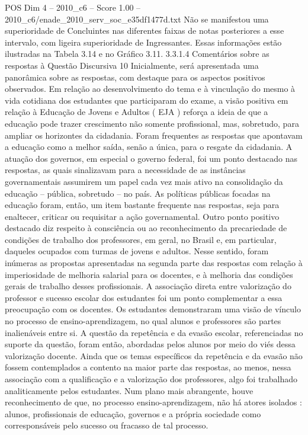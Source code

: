 \begin{textsample}{POS Dim 4 – 2010\_c6 – Score 1.00 – 2010\_c6/enade\_2010\_serv\_soc\_e35df1477d.txt}
Não se manifestou uma superioridade de Concluintes nas diferentes faixas de notas posteriores a esse intervalo, com ligeira superioridade de Ingressantes.
Essas informações estão ilustradas na Tabela 3.14 e no Gráfico 3.11. 3.3.1.4 Comentários sobre as respostas à Questão Discursiva 10 Inicialmente, será apresentada uma panorâmica sobre as respostas, com destaque para os aspectos positivos observados.
Em relação ao desenvolvimento do tema e à vinculação do mesmo à vida cotidiana dos estudantes que participaram do exame, a visão positiva em relação à Educação de Jovens e Adultos ( EJA ) reforça a ideia de que a educação pode trazer crescimento não somente profissional, mas, sobretudo, para ampliar os horizontes da cidadania.
Foram frequentes as respostas que apontavam a educação como a melhor saída, senão a única, para o resgate da cidadania.
A atuação dos governos, em especial o governo federal, foi um ponto destacado nas respostas, as quais sinalizavam para a necessidade de as instâncias governamentais assumirem um papel cada vez mais ativo na consolidação da educação – pública, sobretudo – no país.
As políticas públicas focadas na educação foram, então, um item bastante frequente nas respostas, seja para enaltecer, criticar ou requisitar a ação governamental.
Outro ponto positivo destacado diz respeito à consciência ou ao reconhecimento da precariedade de condições de trabalho dos professores, em geral, no Brasil e, em particular, daqueles ocupados com turmas de jovens e adultos.
Nesse sentido, foram inúmeras as propostas apresentadas na segunda parte das respostas com relação à imperiosidade de melhoria salarial para os docentes, e à melhoria das condições gerais de trabalho desses profissionais.
A associação direta entre valorização do professor e sucesso escolar dos estudantes foi um ponto complementar a essa preocupação com os docentes.
Os estudantes demonstraram uma visão de vínculo no processo de ensino-aprendizagem, no qual alunos e professores são partes inalienáveis entre si.
A questão da repetência e da evasão escolar, referenciadas no suporte da questão, foram então, abordadas pelos alunos por meio do viés dessa valorização docente.
Ainda que os temas específicos da repetência e da evasão não fossem contemplados a contento na maior parte das respostas, ao menos, nessa associação com a qualificação e a valorização dos professores, algo foi trabalhado analiticamente pelos estudantes.
Num plano mais abrangente, houve reconhecimento de que, no processo ensino-aprendizagem, não há atores isolados : alunos, profissionais de educação, governos e a própria sociedade como corresponsáveis pelo sucesso ou fracasso de tal processo.

\end{textsample}
